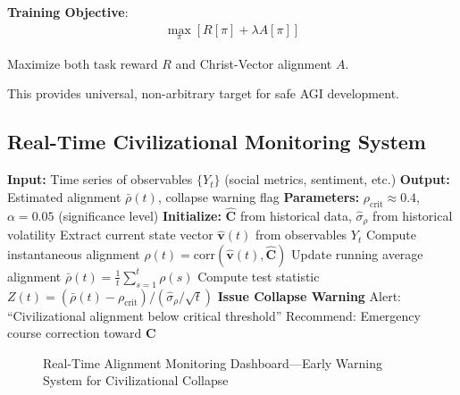 \documentclass[11pt,a4paper]{article}
\theoremstyle{definition}
\theoremstyle{remark}
\begin{document}
\textbf{Training Objective}:
\begin{align}
\max_{\pi} \left[ R[\pi] + \lambda A[\pi] \right]
\end{align}

Maximize both task reward \(R\) and Christ-Vector alignment \(A\).

This provides universal, non-arbitrary target for safe AGI development.

\subsection{Real-Time Civilizational Monitoring System}

\begin{algorithm}[H]
\caption{Real-Time Alignment Monitoring System (RAMS)}
\begin{algorithmic}[1]
\State \textbf{Input:} Time series of observables \(\{Y_t\}\) (social metrics, sentiment, etc.)
\State \textbf{Output:} Estimated alignment \(\bar{\rho}(t)\), collapse warning flag
\State \textbf{Parameters:} \(\rho_{\text{crit}} \approx 0.4\), \(\alpha = 0.05\) (significance level)
\State \textbf{Initialize:} \(\hat{\mathbf{C}}\) from historical data, \(\hat{\sigma}_{\rho}\) from historical volatility
    \State Extract current state vector \(\hat{\mathbf{v}}(t)\) from observables \(Y_t\)
    \State Compute instantaneous alignment \(\rho(t) = \text{corr}(\hat{\mathbf{v}}(t), \hat{\mathbf{C}})\)
    \State Update running average alignment \(\bar{\rho}(t) = \frac{1}{t}\sum_{s=1}^t \rho(s)\)
    \State Compute test statistic \(Z(t) = (\bar{\rho}(t) - \rho_{\text{crit}})/(\hat{\sigma}_{\rho}/\sqrt{t})\)
     
        \State \textbf{Issue Collapse Warning}
        \State Alert: ``Civilizational alignment below critical threshold''
        \State Recommend: Emergency course correction toward \(\mathbf{C}\)
    \EndIf
\EndFor
\end{algorithmic}
\end{algorithm}

\begin{figure}[h!]
\centering
{}
\caption{Real-Time Alignment Monitoring Dashboard—Early Warning System for Civilizational Collapse}
\end{figure}
\end{document}
